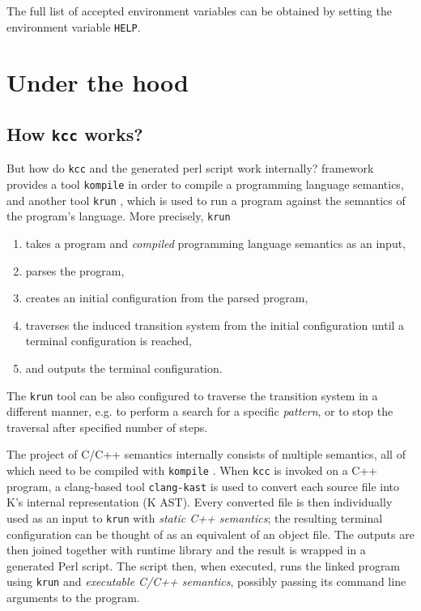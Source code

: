 \documentclass{fithesis3}
\newcommand{\krun}{\texttt{krun} }
\newcommand{\kompile}{\texttt{kompile} }
\newcommand{\clangKast}{\texttt{clang-kast} }
\newcommand{\kcc}{\texttt{kcc} } %
\begin{document}
The full list of accepted environment variables can be obtained by setting the environment variable \texttt{HELP}.




\section{Under the hood}

\subsection{How \kcc works?}

But how do \kcc and the generated perl script work internally? \K framework provides a tool \kompile in order to compile a programming language semantics, and another tool \krun, which is used to run a program against the semantics of the program's language. More precisely, \krun 
\begin{enumerate}
\item takes a program and \textit{compiled} programming language semantics as an input,
\item parses the program,
\item creates an initial configuration from the parsed program,
\item traverses the induced transition system from the initial configuration until a terminal configuration is reached,
\item and outputs the terminal configuration.
\end{enumerate}
The \krun tool can be also configured to traverse the transition system in a different manner, e.g. to perform a search for a specific \textit{pattern}, or to stop the traversal after specified number of steps.

The project of C/C++ semantics internally consists of multiple \K semantics, all of which need to be compiled with \kompile. When \kcc is invoked on a C++ program, a clang-based tool \clangKast is used to convert each source file into K's internal representation (K AST). Every converted file is then individually used as an input to \krun with \textit{static C++ semantics}; the resulting terminal configuration can be thought of as an equivalent of an object file. The outputs are then joined together with runtime library and the result is wrapped in a generated Perl script. The script then, when executed, runs the linked program using \krun and \textit{executable C/C++ semantics}, possibly passing its command line arguments to the program.
\end{document}
